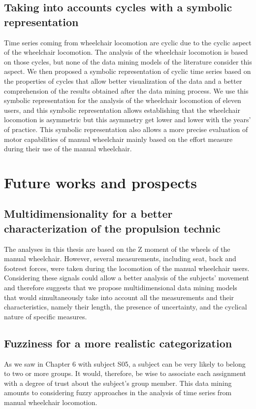 \subsection*{Taking into accounts cycles with a symbolic representation}
Time series coming from wheelchair locomotion are cyclic due to the cyclic aspect of the wheelchair locomotion. The analysis of the wheelchair locomotion is based on those cycles, but none of the data mining models of the literature consider this aspect. We then proposed a symbolic representation of cyclic time series based on the properties of cycles that allow better visualization of the data and a better comprehension of the results obtained after the data mining process. We use this symbolic representation for the analysis of the wheelchair locomotion of eleven users, and this symbolic representation allows establishing that the wheelchair locomotion is asymmetric but this asymmetry get lower and lower with the years' of practice. This symbolic representation also allows a more precise evaluation of motor capabilities of manual wheelchair mainly based on the effort measure during their use of the manual wheelchair.
\section*{Future works and prospects}
\subsection*{Multidimensionality for a better characterization of the propulsion technic}
The analyses in this thesis are based on the Z moment of the wheels of the manual wheelchair. However, several measurements, including seat, back and footrest forces, were taken during the locomotion of the manual wheelchair users. Considering these signals could allow a better analysis of the subjects' movement and therefore suggests that we propose multidimensional data mining models that would simultaneously take into account all the measurements and their characteristics, namely their length, the presence of uncertainty, and the cyclical nature of specific measures.
\subsection*{Fuzziness for a more realistic categorization}
As we saw in Chapter 6 with subject S05, a subject can be very likely to belong to two or more groups. It would, therefore, be wise to associate each assignment with a degree of trust about the subject's group member. This data mining amounts to considering fuzzy approaches in the analysis of time series from manual wheelchair locomotion.